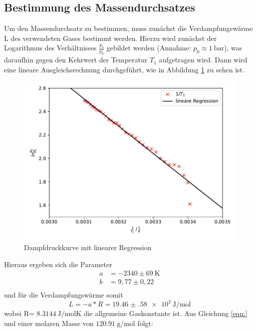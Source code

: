 \subsection{Bestimmung des Massendurchsatzes}
Um den Massendurchsatz zu bestimmen, muss zunächst die Verdampfungswärme L des
verwendeten Gases bestimmt werden.
Hierzu wird zunächst der Logarithmus des Verhältnisses $\frac{p_b}{p_0}$ gebildet werden
(Annahme: $p_0 \approx \SI{1}{\bar}$), was daraufhin gegen den Kehrwert der Temperatur $T_1$
aufgetragen wird. Dann wird eine lineare Ausgleichsrechnung durchgeführt, wie in
Abbildung \ref{fig:plot2} zu sehen ist.
\begin{figure}[H]
  \centering
  \includegraphics{plot2.pdf}
  \caption{Dampfdruckkurve mit linearer Regression}
  \label{fig:plot2}
\end{figure}
Hieraus ergeben sich die Parameter
\begin{align*}
  a&= -2340 \pm 69 \: \si{\kelvin} \\
  b&= 9,77 \pm 0,22 \\
\end{align*}
und für die Verdampfungswärme somit
\begin{equation*}
  L= -a*R = \SI{19.46(58)e3}{\joule\per\mol}
\end{equation*}
wobei R= $\SI{8.3144}{\joule\per\mol\kelvin}$ \cite{chemie2} die allgemeine Gaskonstante ist.
Aus Gleichung \ref{eqn:} und einer molaren Masse von $\SI{120.91}{\gram\per\mol}$
\cite{chemie3} folgt:


